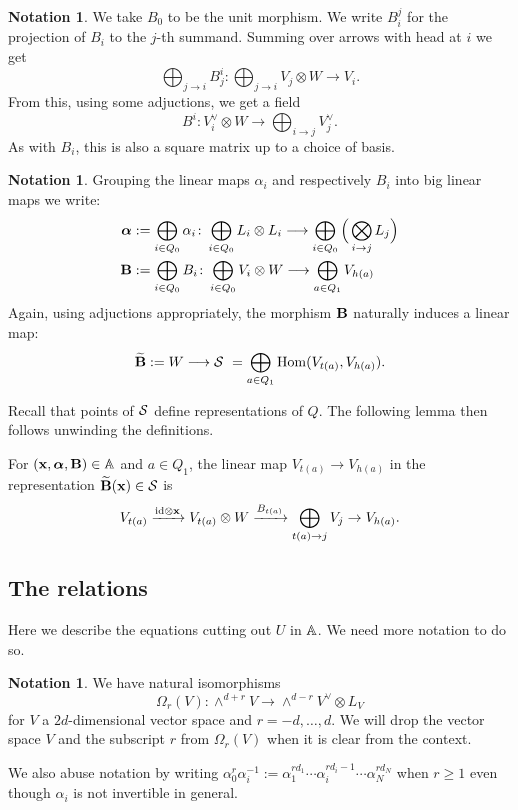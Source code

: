 \documentclass{amsart}
\newcommand{\balpha}{\boldsymbol{\alpha}}
\theoremstyle{definition}
\newtheorem{notn}[theorem]{Notation}
\begin{document}
\begin{notn}
We take $B_0$ to be the unit morphism.
We write $B_i^j$ for the projection of $B_i$ to the $j$-th summand. 
Summing over arrows with head at $i$ we get $$\bigoplus_{j \rightarrow i} B_j^i \colon \bigoplus_{j \rightarrow i} V_j \otimes W \longrightarrow V_i.$$
From this, using some adjuctions, we get a field $$B^{i} \colon V_i^\vee \otimes W \longrightarrow \bigoplus_{i \rightarrow j} V_j^\vee.$$
As with $B_i$, this is also a square matrix up to a choice of basis.
\end{notn}

\begin{notn}
Grouping the linear maps $\alpha_i$ and respectively $B_i$ into big linear maps we write: 
\begin{align*}
\balpha &:= \bigoplus_{i\in Q_0} \alpha_i \colon \bigoplus_{i\in Q_0} L_i \otimes L_i \longrightarrow \bigoplus_{i \in Q_0} \Big( \bigotimes_{i \rightarrow j} L_j \Big) \\
\bfB &:= \bigoplus_{i\in Q_0} B_i \colon \bigoplus_{i\in Q_0} V_i \otimes W \longrightarrow \bigoplus_{a \in Q_1} V_{h(a)}
\end{align*}
Again, using adjuctions appropriately, the morphism $\mathbf{B}$ naturally induces a linear map:
$$\widetilde{\mathbf{B}} := W \longrightarrow \mathcal{S} \,\,=\bigoplus_{a \in Q_1} \operatorname{Hom}(V_{t(a)}, V_{h(a)}).$$
\end{notn}

Recall that points of $\mathcal{S}$ define representations of $Q$.
The following lemma then follows unwinding the definitions.

\begin{lemma}\label{lem:Btilde}
For $(\bfx, \balpha, \bfB) \in \bA$ and $a \in Q_1$, the linear map $V_{t(a)} \rightarrow V_{h(a)}$ in the representation $\widetilde{\mathbf{B}}(\mathbf{x}) \in \mathcal{S}$ is 
$$V_{t(a)} \xrightarrow{\textup{id} \otimes \mathbf{x}} V_{t(a)} \otimes W \xrightarrow{B_{t(a)}} \bigoplus_{t(a) \rightarrow j} V_j \rightarrow V_{h(a)}.$$
\end{lemma}

\subsection{The relations}
Here we describe the equations cutting out $U$ in $\mathbb{A}$.
We need more notation to do so.

\begin{notn}
We have natural isomorphisms
$$\Omega_r(V) \colon \wedge^{d+r} V \rightarrow \wedge^{d-r} V^\vee \otimes L_V$$ for $V$ a $2d$-dimensional vector space and $r= -d, \ldots, d$.
We will drop the vector space $V$ and the subscript $r$ from $\Omega_r(V)$ when it is clear from the context.

We also abuse notation by writing $\alpha_0^r \alpha_i^{-1} := \alpha_1^{rd_1} \cdots \alpha_i^{rd_i-1} \cdots \alpha_N^{rd_N}$ when $r\geq 1$ even though $\alpha_i$ is not invertible in general.
\end{notn}
\end{document}
